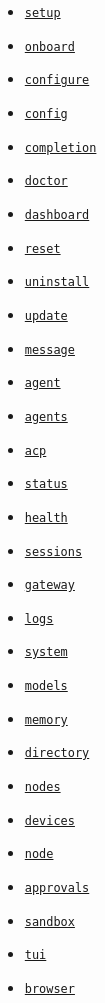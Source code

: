\begin{itemize}
  \item \href{/cli/setup}{\texttt{setup}}
  \item \href{/cli/onboard}{\texttt{onboard}}
  \item \href{/cli/configure}{\texttt{configure}}
  \item \href{/cli/config}{\texttt{config}}
  \item \href{/cli/completion}{\texttt{completion}}
  \item \href{/cli/doctor}{\texttt{doctor}}
  \item \href{/cli/dashboard}{\texttt{dashboard}}
  \item \href{/cli/reset}{\texttt{reset}}
  \item \href{/cli/uninstall}{\texttt{uninstall}}
  \item \href{/cli/update}{\texttt{update}}
  \item \href{/cli/message}{\texttt{message}}
  \item \href{/cli/agent}{\texttt{agent}}
  \item \href{/cli/agents}{\texttt{agents}}
  \item \href{/cli/acp}{\texttt{acp}}
  \item \href{/cli/status}{\texttt{status}}
  \item \href{/cli/health}{\texttt{health}}
  \item \href{/cli/sessions}{\texttt{sessions}}
  \item \href{/cli/gateway}{\texttt{gateway}}
  \item \href{/cli/logs}{\texttt{logs}}
  \item \href{/cli/system}{\texttt{system}}
  \item \href{/cli/models}{\texttt{models}}
  \item \href{/cli/memory}{\texttt{memory}}
  \item \href{/cli/directory}{\texttt{directory}}
  \item \href{/cli/nodes}{\texttt{nodes}}
  \item \href{/cli/devices}{\texttt{devices}}
  \item \href{/cli/node}{\texttt{node}}
  \item \href{/cli/approvals}{\texttt{approvals}}
  \item \href{/cli/sandbox}{\texttt{sandbox}}
  \item \href{/cli/tui}{\texttt{tui}}
  \item \href{/cli/browser}{\texttt{browser}}

\end{itemize}
